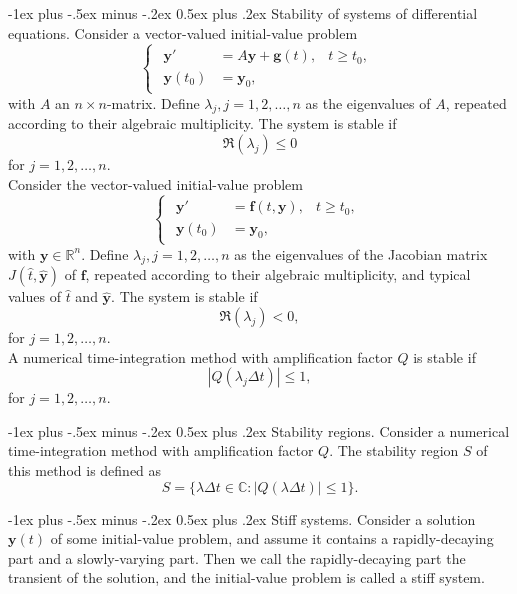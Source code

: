 \documentclass[10pt,landscape,a4paper]{article}
\makeatletter
\newcommand{\R}{\mathbb{R}}
\renewcommand{\section}{\@startsection{section}{1}{0mm}%
	{-1ex plus -.5ex minus -.2ex}%
	{0.5ex plus .2ex}%
	{\normalfont\large\bfseries}}
\makeatother
\begin{document}
\begin{multicols}{3}
		\section{Stability of systems of differential equations.}
		Consider a vector-valued initial-value problem
		\[
			\begin{cases}
				\begin{aligned}
					\textbf{y}'&=A\textbf{y}+\textbf{g}(t),&t\geq t_0,\\
					\textbf{y}(t_0)&=\textbf{y}_0,&
				\end{aligned}
			\end{cases}
		\]
		with $ A $ an $ n\times n $-matrix. Define $ \lambda_j,j=1,2,\hdots,n $ as the eigenvalues of $ A $, repeated according to their algebraic multiplicity.
		The system is stable if
		\[
			\Re(\lambda_j)\leq0
		\]
		for $ j=1,2,\hdots,n $.\\
		Consider the vector-valued initial-value problem
		\[
			\begin{cases}
				\begin{aligned}
					\textbf{y}'&=\textbf{f}(t,\textbf{y}),&t\geq t_0,\\
					\textbf{y}(t_0)&=\textbf{y}_0,&
				\end{aligned}
			\end{cases}
		\]
		with $ \textbf{y}\in\R^n $. Define $ \lambda_j,j=1,2,\hdots,n $ as the eigenvalues of the Jacobian matrix $ J(\hat{t},\hat{\textbf{y}}) $ of $ \textbf{f} $, repeated according to their algebraic multiplicity, and typical values of $ \hat{t} $ and $ \hat{\textbf{y}} $. The system is stable if
		\[
			\Re(\lambda_j)<0,
		\]
		for $ j=1,2,\hdots,n $.\\
		A numerical time-integration method with amplification factor $ Q $ is stable if
		\[
			|Q(\lambda_j\Delta t)|\leq 1,
		\]
		for $ j=1,2,\hdots,n $.
		
		\section{Stability regions.}
		Consider a numerical time-integration method with amplification factor $ Q $. The stability region $ S $ of this method is defined as
		\[
			S=\{\lambda\Delta t\in \mathbb{C}:|Q(\lambda\Delta t)|\leq 1\}.
		\]
		
		\section{Stiff systems.}
		Consider a solution $ \textbf{y}(t) $ of some initial-value problem, and assume it contains a rapidly-decaying part and a slowly-varying part. Then we call the rapidly-decaying part the transient of the solution, and the initial-value problem is called a stiff system.
		

\end{multicols}
\end{document}
